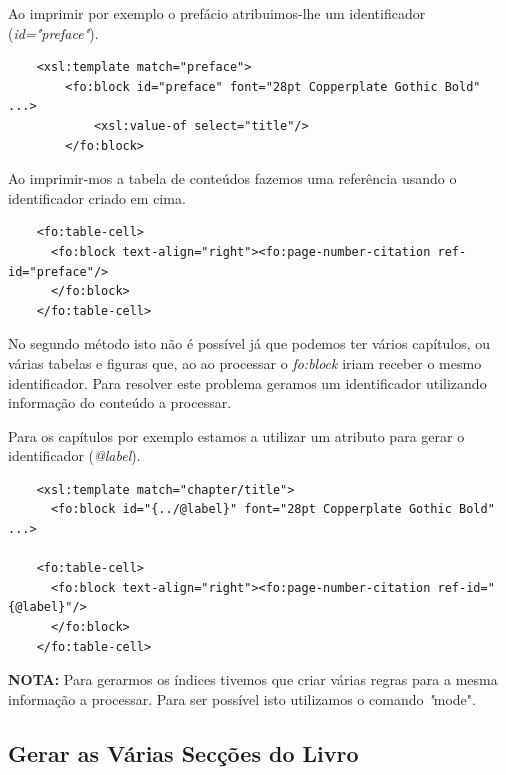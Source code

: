 \documentclass[a4paper]{article}
\begin{document}
Ao imprimir por exemplo o prefácio atribuimos-lhe um identificador ({\em id="preface"}).
\begin{small}
\begin{lstlisting}
    <xsl:template match="preface">
        <fo:block id="preface" font="28pt Copperplate Gothic Bold" ...>
            <xsl:value-of select="title"/>
        </fo:block>
\end{lstlisting}
\end{small}
    
Ao imprimir-mos a tabela de conteúdos fazemos uma referência usando o identificador criado em cima.
\begin{small}
\begin{lstlisting}
    <fo:table-cell>
      <fo:block text-align="right"><fo:page-number-citation ref-id="preface"/>
      </fo:block>
    </fo:table-cell>
\end{lstlisting}
\end{small}
    
\hspace{1cm}No segundo método isto não é possível já que podemos ter vários capítulos, ou várias tabelas e figuras que, ao ao processar o {\em fo:block} iriam receber o mesmo identificador. Para resolver este problema geramos um identificador utilizando informação do conteúdo a processar.
  
Para os capítulos por exemplo estamos a utilizar um atributo para gerar o identificador ({\em @label}).
\begin{small}
\begin{lstlisting}
    <xsl:template match="chapter/title">
      <fo:block id="{../@label}" font="28pt Copperplate Gothic Bold" ...>
      
    <fo:table-cell>
      <fo:block text-align="right"><fo:page-number-citation ref-id="{@label}"/>
      </fo:block>
    </fo:table-cell>
\end{lstlisting}
\end{small}

\vspace{0.5cm}
\textbf{NOTA:} Para gerarmos os índices tivemos que criar várias regras para a mesma informação a processar. Para ser possível isto utilizamos o comando \emph "mode".\\

\vspace{0.5cm}
\subsection{\large Gerar as Várias Secções do Livro}
\end{document}
